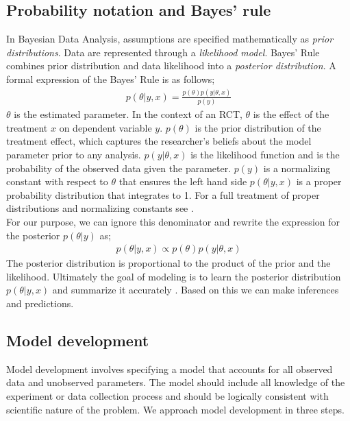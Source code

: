 \documentclass{article}
\begin{document}
\subsection*{Probability notation and Bayes' rule}
In Bayesian Data Analysis, assumptions are specified mathematically as \textit{prior distributions}.  Data are represented through a \textit{likelihood model}. Bayes' Rule combines prior distribution and data likelihood into a \textit{posterior distribution}.  A formal expression of the Bayes' Rule is as follows;
\begin{align}
{p(\theta| y, x) = \frac{ p(\theta) p(y|\theta, x)}{p(y)}}
\end{align}
$\theta$ is the estimated parameter. In the context of an RCT, $\theta$ is the effect of the treatment $x$ on dependent variable $y$. $p(\theta)$ is the prior distribution of the treatment effect, which captures the researcher's beliefs about the model parameter prior to any analysis. $p(y | \theta, x)$ is the likelihood function and is the probability of the observed data given the parameter.  $p(y)$ is a normalizing constant with respect to $\theta$ that ensures the left hand side $p(\theta |y, x)$ is a proper probability distribution that integrates to 1. For a full treatment of proper distributions and normalizing constants see . \\
For our purpose, we can ignore this denominator and rewrite the expression for the posterior $p(\theta | y)$ as;
 \begin{align}
 p(\theta | y, x) \propto p(\theta) p(y |\theta, x)
 \end{align}
The posterior distribution is proportional to the product of the prior and the likelihood. Ultimately the goal of modeling is to learn the posterior distribution $p(\theta|y, x)$ and summarize it accurately \cite{gelman2014bayesian}. Based on this we can make inferences and predictions.

\subsection*{Model development}
Model development involves specifying a model that accounts for all observed data and unobserved parameters. The model should include all knowledge of the experiment or data collection process and should be logically consistent with scientific nature of the problem. We approach model development in three steps.
\end{document}
